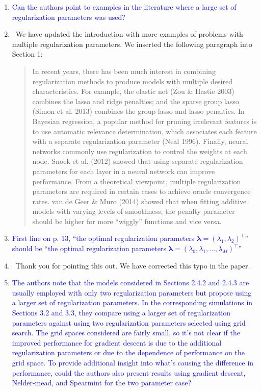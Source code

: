 \documentclass[]{article}
\newcommand{\point}[1]{\item \textcolor{blue}{#1}}
\newcommand{\reply}{\item[]\ }
\begin{document}
	\begin{enumerate}
		\point{Can the authors point to examples in the literature where a large set of regularization parameters was used?}
		
		\reply We have updated the introduction with more examples of problems with multiple regularization parameters. We inserted the following paragraph into Section 1:
		
		\begin{quote}
			In recent years, there has been much interest in combining regularization methods to produce models with multiple desired characteristics. For example, the elastic net (Zou \& Hastie 2003) combines the lasso and ridge penalties; and the sparse group lasso (Simon et al. 2013) combines the group lasso and lasso penalties. In Bayesian regression, a popular method for pruning irrelevant features is to use automatic relevance determination, which associates each feature with a separate regularization parameter (Neal 1996). Finally, neural networks commonly use regularization to control the weights at each node. Snoek et al. (2012) showed that using separate regularization parameters for each layer in a neural network can improve performance. From a theoretical viewpoint, multiple regularization parameters are required in certain cases to achieve oracle convergence rates. van de Geer \& Muro (2014) showed that when fitting additive models with varying levels of smoothness, the penalty parameter should be higher for more ``wiggly'' functions and vice versa. 
		\end{quote}
		
		\point{First line on p. 13, ``the optimal regularization parameters $\boldsymbol{\lambda} = (\lambda_1,\lambda_2)^\top$'' should be ``the optimal regularization parameters $\boldsymbol{\lambda} = (\lambda_0, \lambda_1, ... , \lambda_M)^\top$''}
		
		\reply Thank you for pointing this out. We have corrected this typo in the paper.
		
		\point{The authors note that the models considered in Sections 2.4.2 and 2.4.3 are usually employed with only two regularization parameters but propose using a larger set of regularization parameters. In the corresponding simulations in Sections 3.2 and 3.3, they compare using a larger set of regularization parameters against using two regularization parameters selected using grid search. The grid spaces considered are fairly small, so it’s not clear if the improved performance for gradient descent is due to the additional regularization parameters or due to the dependence of performance on the grid space. To provide additional insight into what’s causing the difference in performance, could the authors also present results using gradient descent, Nelder-mead, and Spearmint for the two parameter case?}
		

\end{enumerate}
\end{document}
